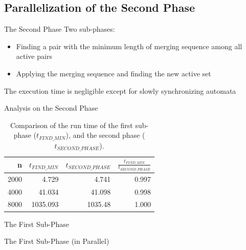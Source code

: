 \documentclass{beamer}
\begin{document}
\subsection{Parallelization of the Second Phase}
\begin{frame}{The Second Phase}
	Two sub-phases:
	\begin{itemize}
		\item Finding a pair with the minimum length of merging sequence among all active pairs
		\item Applying the merging sequence and finding the new active set
	\end{itemize}
	
	The execution time is negligible except for slowly synchronizing automata
\end{frame}

\begin{frame}{Analysis on the Second Phase}
\begin{table}[ht]
	\begin{tabular}{r|rrr}
			
		n & $t_{FIND\_MIN}$ & $t_{SECOND\_PHASE}$ & $\frac{t_{FIND\_MIN}}{t_{SECOND\_PHASE}}$ \\\hline
		2000 & 4.729 & 4.741 & 0.997 \\
		4000 & 41.034 & 41.098 & 0.998 \\
		8000 & 1035.093 & 1035.48 & 1.000 \\
	\end{tabular}
	
	\caption{Comparison of the run time of the first sub-phase ($t_{FIND\_MIN}$), and the second phase ($t_{SECOND\_PHASE}$).}
	\label{table:phase-2-comparison}
\end{table}
\end{frame}

\begin{frame}{The First Sub-Phase}
\end{frame}


\begin{frame}{The First Sub-Phase (in Parallel)}
\end{frame}
\end{document}
